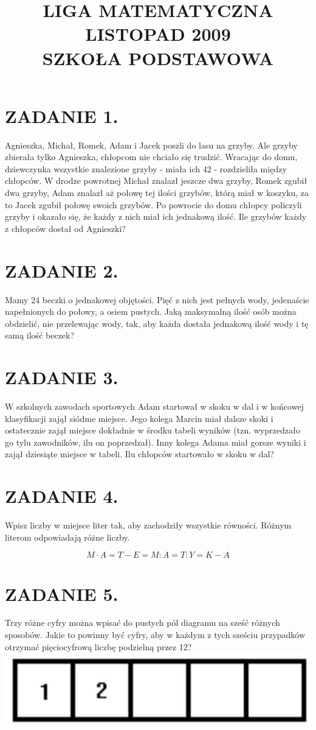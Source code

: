\documentclass[10pt]{article}
\title{LIGA MATEMATYCZNA \\
 LISTOPAD 2009 \\
 SZKOŁA PODSTAWOWA }
\author{}
\date{}
\begin{document}
\maketitle
\section*{ZADANIE 1.}
Agnieszka, Michał, Romek, Adam i Jacek poszli do lasu na grzyby. Ale grzyby zbierała tylko Agnieszka, chłopcom nie chciało się trudzić. Wracając do domu, dziewczynka wszystkie znalezione grzyby - miała ich 42 - rozdzieliła między chłopców. W drodze powrotnej Michał znalazł jeszcze dwa grzyby, Romek zgubił dwa grzyby, Adam znalazł aż połowę tej ilości grzybów, którą miał w koszyku, za to Jacek zgubił połowę swoich grzybów. Po powrocie do domu chłopcy policzyli grzyby i okazało się, że każdy z nich miał ich jednakową ilość. Ile grzybów każdy z chłopców dostał od Agnieszki?

\section*{ZADANIE 2.}
Mamy 24 beczki o jednakowej objętości. Pięć z nich jest pełnych wody, jedenaście napełnionych do połowy, a osiem pustych. Jaką maksymalną ilość osób można obdzielić, nie przelewając wody, tak, aby każda dostała jednakową ilość wody i tę samą ilość beczek?

\section*{ZADANIE 3.}
W szkolnych zawodach sportowych Adam startował w skoku w dal i w końcowej klasyfikacji zajął siódme miejsce. Jego kolega Marcin miał dalsze skoki i ostatecznie zajął miejsce dokładnie w środku tabeli wyników (tzn. wyprzedzało go tylu zawodników, ilu on poprzedzał). Inny kolega Adama miał gorsze wyniki i zajął dziesiąte miejsce w tabeli. Ilu chłopców startowało w skoku w dal?

\section*{ZADANIE 4.}
Wpisz liczby w miejsce liter tak, aby zachodziły wszystkie równości. Różnym literom odpowiadają różne liczby.

\[
M \cdot A=T-E=M: A=T: Y=K-A
\]

\section*{ZADANIE 5.}
Trzy różne cyfry można wpisać do pustych pól diagramu na sześć różnych sposobów. Jakie to powinny być cyfry, aby w każdym z tych sześciu przypadków otrzymać pięciocyfrową liczbę podzielną przez 12?\\
\includegraphics[max width=\textwidth, center]{2024_11_21_92a58bd76571d338b972g-1}
\end{document}
